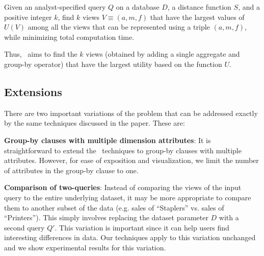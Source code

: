 \begin{problem}
\vspace{-5pt}
Given an analyst-specified query $Q$ on a database $D$, a distance function $S$,
and a positive integer $k$, find $k$ views $V \equiv (a, m, f)$ that
have the largest values of $U(V)$ among all the views that can be represented
using a triple $(a, m, f)$, while minimizing total computation time.
\vspace{-5pt}
\end{problem}

Thus, \SeeDB\ aims to find the $k$ views (obtained by adding a single aggregate
and group-by operator) that have the largest utility based on the function $U$.



\subsection{Extensions}
There are two important variations of the problem that can be addressed exactly
by the same techniques discussed in the paper. These are:

\vspace{5 mm}

\squishlist
\item {\bf Group-by clauses with multiple dimension attributes}: It is
straightforward to extend the \SeeDB\ techniques  to group-by clauses with multiple attributes.
However, for ease of exposition and visualization, we limit the number of
attributes in the group-by clause to one.
\item {\bf Comparison of two-queries}: Instead of comparing the views of
the input query to the entire underlying dataset, it may be more appropriate to
compare them to another subset of the data (e.g. sales of ``Staplers'' vs.
sales of ``Printers''). This simply involves replacing the dataset parameter $D$
with a second query $Q'$. This variation is important since it can help users
find interesting differences in data. Our techniques apply to this variation
unchanged and we show experimental results for this variation.
\squishend


